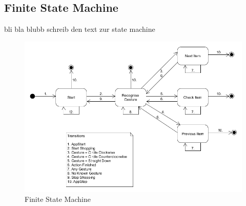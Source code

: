 \subsection{Finite State Machine}
bli bla blubb schreib den text zur state machine
\begin{figure}
\centering
\captionsetup{justification=centering}
\includegraphics[width=\textwidth]{res/sa/PresentationStateMachineNew.png}
\caption{Finite State Machine}
\label{fig:state machine}
\end{figure}



